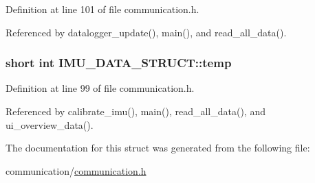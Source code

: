 Definition at line 101 of file communication.\-h.



Referenced by datalogger\-\_\-update(), main(), and read\-\_\-all\-\_\-data().

\hypertarget{structIMU__DATA__STRUCT_a81e1dbf765c1d947ca6076aa1bbc73e7}{
\subsubsection[{temp}]{\setlength{\rightskip}{0pt plus 5cm}short int I\-M\-U\-\_\-\-D\-A\-T\-A\-\_\-\-S\-T\-R\-U\-C\-T\-::temp}}\label{structIMU__DATA__STRUCT_a81e1dbf765c1d947ca6076aa1bbc73e7}


Definition at line 99 of file communication.\-h.



Referenced by calibrate\-\_\-imu(), main(), read\-\_\-all\-\_\-data(), and ui\-\_\-overview\-\_\-data().



The documentation for this struct was generated from the following file\-:\begin{DoxyCompactItemize}
\item 
communication/\hyperlink{communication_2communication_8h}{communication.\-h}\end{DoxyCompactItemize}
